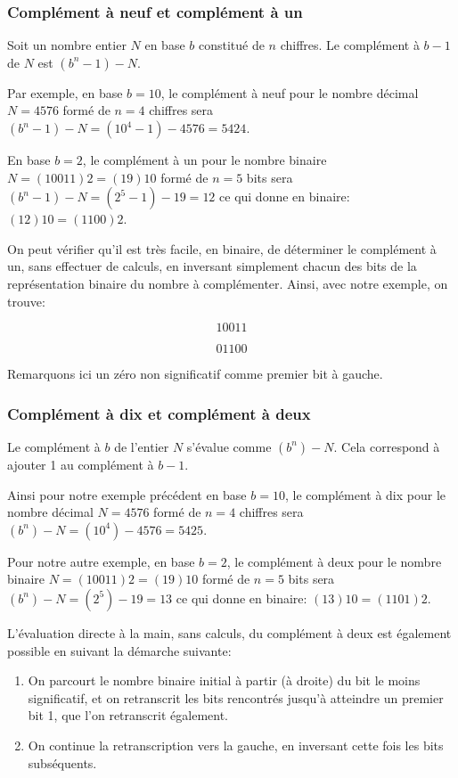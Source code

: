 \documentclass[11pt]{article}
\begin{document}
\subsubsection{Complément à neuf et complément à un}
\label{sec:org855f1a5}

Soit un nombre entier \(N\) en base \(b\) constitué de \(n\) chiffres. Le
complément à \(b-1\) de \(N\) est \((b^n-1)-N\).

Par exemple, en base \(b=10\), le complément à neuf pour le nombre décimal
\(N = 4576\) formé de \(n=4\) chiffres sera \((b^n-1)-N = (10^4 -1) -
4576 = 5424\).

En base \(b=2\), le complément à un pour le nombre binaire \(N =
(10011)2 = (19)10\) formé de \(n=5\) bits sera \((b^n-1)-N = (2^5
-1) - 19 = 12\) ce qui donne en binaire: \((12)10 = (1100)2\).

On peut vérifier qu'il est très facile, en binaire, de déterminer le
complément à un, sans effectuer de calculs, en inversant simplement
chacun des bits de la représentation binaire du nombre à
complémenter. Ainsi, avec notre exemple, on trouve:

$$ 10011 $$

$$ 01100 $$

Remarquons ici un zéro non significatif comme premier bit à gauche.

\subsubsection{Complément à dix et complément à deux}
\label{sec:org219ece0}

Le complément à \(b\) de l'entier \(N\) s'évalue comme
\((b^n)-N\). Cela correspond à ajouter 1 au complément à \(b-1\).

Ainsi pour notre exemple précédent en base \(b=10\), le complément à
dix pour le nombre décimal \(N = 4576\) formé de \(n=4\) chiffres sera
\((b^n)-N = (10^4) - 4576 = 5425\).

Pour notre autre exemple, en base \(b=2\), le complément à deux pour
le nombre binaire \(N = (10011)2 = (19)10\) formé de \(n=5\) bits
sera \((b^n)-N = (2^5) - 19 = 13\) ce qui donne en binaire:
\((13)10 = (1101)2\).

L'évaluation directe à la main, sans calculs, du complément à deux est
également possible en suivant la démarche suivante:
\begin{enumerate}
\item On parcourt le nombre binaire initial à partir (à droite) du bit le moins
significatif, et on retranscrit les bits rencontrés jusqu'à
atteindre un premier bit 1, que l'on retranscrit également.
\item On continue la retranscription vers la gauche, en inversant cette
fois les bits subséquents.
\end{enumerate}
\end{document}
